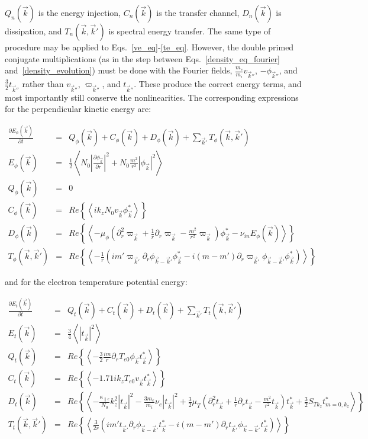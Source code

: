 \documentclass[showpacs,preprintnumbers,amsmath,amssymb,superscriptaddress,aip]{revtex4-1}
\def\beqar{\begin{eqnarray}}
\def\eeqar{\end{eqnarray}}
\newcommand{\pdiff}[2]{\frac{\partial#1}{\partial#2}}
\newcommand{\pdr}{\partial_r}
\newcommand{\pdrr}{\partial^2_r}
\newcommand{\nue}{\nu_{e}}
\newcommand{\nuin}{\nu_{in}}
\newcommand{\kpe}{\kappa_{\parallel e}}
\newcommand{\fmei}{\frac{m_e}{m_i}}
\begin{document}
$Q_n(\vec{k})$ is the energy injection, $C_n(\vec{k})$ is the transfer channel, $D_n(\vec{k})$ is dissipation, and $T_n(\vec{k},\vec{k}')$ is spectral energy transfer.
The same type of procedure may be applied to Eqs.~\ref{ve_eq}-\ref{te_eq}. 
However, the double primed conjugate multiplications (as in the step between Eqs.~\ref{density_eq_fourier} and~\ref{density_evolution}) 
must be done with the Fourier fields, $\fmei v_{\vec{k}''}$,  $- \phi_{\vec{k}''}$, and $\frac{3}{2} t_{\vec{k}''}$ rather than 
$v_{\vec{k}''}$, $\varpi_{\vec{k}''}$, and $t_{\vec{k}''}$.
These produce the correct energy terms, and most importantly still conserve the nonlinearities. The corresponding expressions for the perpendicular kinetic energy are:

\beqar
\label{Fourier_phi_evolution}
\pdiff{E_\phi(\vec{k})}{t} & = & Q_\phi(\vec{k}) + C_\phi(\vec{k}) + D_\phi(\vec{k}) + \sum_{\vec{k}'} T_\phi(\vec{k},\vec{k}') \\
E_\phi(\vec{k}) & = & \frac{1}{2} \left<  N_0 \left| \pdiff{\phi_{\vec{k}}}{r} \right|^2 + N_0 \frac{m^2}{r^2} |\phi_{\vec{k}}|^2  \right>\\
Q_\phi(\vec{k}) & = & 0 \\
C_\phi(\vec{k}) & = & Re \left\{ \left< i k_z N_0 v_{\vec{k}} \phi_{\vec{k}}^* \right> \right\} \\
D_\phi(\vec{k}) & = & Re \left\{ \left<  - \mu_\phi( \pdrr \varpi_{\vec{k}} + \frac{1}{r} \pdr \varpi_{\vec{k}} - \frac{m^2}{r^2} \varpi_{\vec{k}}) \phi_{\vec{k}}^* -  \nuin E_\phi(\vec{k})\right> \right\} \\
T_\phi(\vec{k},\vec{k}') & = & Re \left\{ \left< - \frac{1}{r} \left( i m' \varpi_{\vec{k}'} \pdr \phi_{\vec{k}-\vec{k}'} \phi_{\vec{k}}^*  - i (m - m') \pdr \varpi_{\vec{k}'} \phi_{\vec{k}-\vec{k}'} \phi_{\vec{k}}^*        \right) \right> \right\}
\eeqar

and for the electron temperature potential energy:

\beqar
\label{Fourier_te_evolution}
\pdiff{E_t(\vec{k})}{t} & = & Q_t(\vec{k}) + C_t(\vec{k}) + D_t(\vec{k}) + \sum_{\vec{k}'} T_t(\vec{k},\vec{k}') \\
E_t(\vec{k}) & = & \frac{3}{4} \left< |t_{\vec{k}}|^2  \right> \\
Q_t(\vec{k}) & = & Re \left\{ \left< - \frac{3}{2} \frac{i m}{r} \pdr T_{e0} \phi_{\vec{k}} t_{\vec{k}}^* \right> \right\} \\
C_t(\vec{k}) & = & Re \left\{ \left<  - 1.71 i k_z T_{e0} v_{\vec{k}} t_{\vec{k}}^* \right> \right\} \\
D_t(\vec{k}) & = & Re \left\{ \left< -\frac{\kpe}{N_0} k_z^2 |t_{\vec{k}}|^2  - \frac{3 m_e}{m_i} \nue |t_{\vec{k}}|^2 
+ \frac{3}{2} \mu_T( \pdrr t_{\vec{k}} + \frac{1}{r} \pdr t_{\vec{k}} - \frac{m^2}{r^2} t_{\vec{k}}) t_{\vec{k}}^*  + \frac{3}{2} S_{T k_z} t_{m=0,k_z}^*  \right> \right\} \\
T_t(\vec{k},\vec{k}') & = & Re \left\{ \left< \frac{3}{2 r} \left( i m' t_{\vec{k}'} \pdr \phi_{\vec{k}-\vec{k}'} t_{\vec{k}}^*  - i (m - m') \pdr t_{\vec{k}'} \phi_{\vec{k}-\vec{k}'} t_{\vec{k}}^*        \right) \right> \right\}
\eeqar
\end{document}
